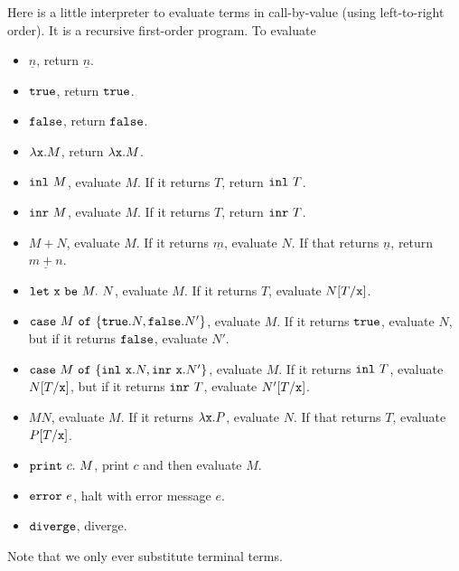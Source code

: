 \documentclass[runningheads,12pt]{llncs}
\newcommand{\ttletmac}[2]{\mathtt{let}\ {#2}\ \mathtt{be}\ {#1}.\ }
\begin{document}
Here is a little interpreter to evaluate terms in call-by-value (using left-to-right order). It is a recursive first-order program.  To evaluate 
\begin{itemize}
\item  $\underline{n}$, return $\underline{n}$.
\item $\mathtt{true}$, return $\mathtt{true}$.
\item $\mathtt{false}$, return $\mathtt{false}$.
\item $\lambda \mathtt{x}. M$, return $\lambda \mathtt{x}. M$.
\item $\mathtt{inl} \  {M}$, evaluate $M$.  If it returns $T$, return $\mathtt{inl} \  {T}$.
\item $\mathtt{inr} \  {M}$, evaluate $M$.  If it returns $T$, return $\mathtt{inr} \  {T}$.
\item $M+N$, evaluate $M$.  If it returns $\underline{m}$, evaluate $N$.  If that returns $\underline{n}$, return $\underline{m+n}$.
\item $\ttletmac{ M }{ \ttx } N$, evaluate $M$.  If it returns $T$, evaluate $N[T/\mathtt{x}]$.
\item $\mathtt{case} \  M \ \mathtt{of}\  \{ \mathtt{true}. N, \mathtt{false}. N' \}$, evaluate $M$.  If it returns $\mathtt{true}$, evaluate $N$, but if it returns $\mathtt{false}$, evaluate $N'$.
\item $\mathtt{case} \  M \ \mathtt{of}\  \{ \mathtt{inl} \  {\mathtt{x}}. N, \mathtt{inr} \  {\mathtt{x}}. N' \}$, evaluate $M$.  If it returns $\mathtt{inl} \  {T}$, evaluate $N[T/\mathtt{x}]$, but if it returns $\mathtt{inr} \  {T}$, evaluate $N'[T/\mathtt{x}]$.
\item $MN$, evaluate $M$.  If it returns $\lambda \mathtt{x}. P$, evaluate $N$.  If that returns $T$, evaluate $P[T/\mathtt{x}]$.
\item $\mathtt{print}\  {c}.\ M$, print $c$ and then evaluate $M$.
\item $\mathtt{error}\  e$, halt with error message $e$.
\item $\mathtt{diverge}$, diverge.
\end{itemize}
Note that we only ever substitute terminal terms.
\end{document}
